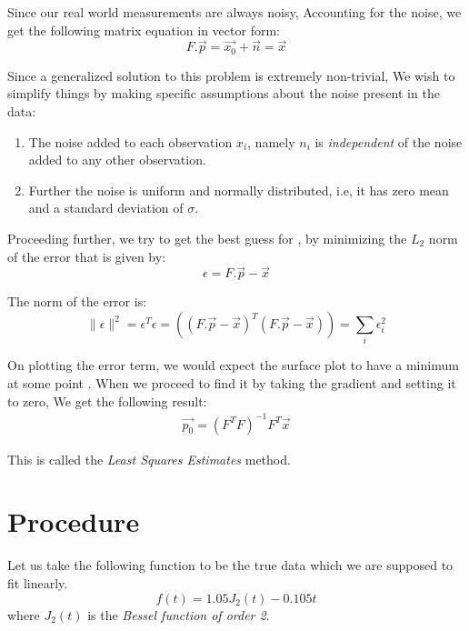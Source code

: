 \documentclass[11pt, a4paper]{article}
\begin{document}
        Since our real world measurements are always noisy, Accounting for the noise, we get the following matrix equation in vector form:
        \begin{equation}
            F.\vec{p} = \vec{x_0}+\vec{n} = \vec{x}
            \label{truenoiseeqn}
        \end{equation}
        
        Since a generalized solution to this problem is extremely non-trivial, We wish to simplify things by making specific assumptions about the noise present in the data:
        \begin{enumerate}
            \item The noise added to each observation $x_i$, namely $n_i$ is \emph{independent} of the noise added to any other observation.
            \item Further the noise is uniform and normally distributed, i.e, it has zero mean and a standard deviation of $\sigma$.
        \end{enumerate}
     
        Proceeding further, we try to get the best guess for , by minimizing the $L_2$ norm of the error that is given by:
        \begin{equation}
            \epsilon = F.\vec{p} - \vec{x}
        \end{equation}

        The norm of the error is:
        \begin{equation}
            \|\epsilon\|^2 = \epsilon^T\epsilon = ((F.\vec{p}-\vec{x})^T(F.\vec{p}-\vec{x})) = \sum_{i}\epsilon_i^2
        \end{equation}

        On plotting the error term, we would expect the surface plot to have a minimum at some point . When we proceed to find it by taking the gradient and setting it to zero, We get the following result:\\
        \begin{equation}
            \begin{aligned}
                \vec{p_0} = (F^TF)^{-1}F^T\vec{x}
            \end{aligned}
        \end{equation}

        This is called the \emph{Least Squares Estimates} method.\\

    \section{Procedure}
        Let us take the following function to be the true data which we are supposed to fit linearly.
        \begin{equation}
            f(t) = 1.05J_2(t)-0.105t
        \end{equation}
        where $J_2(t)$ is the \textit{Bessel function of order 2}.
\end{document}
